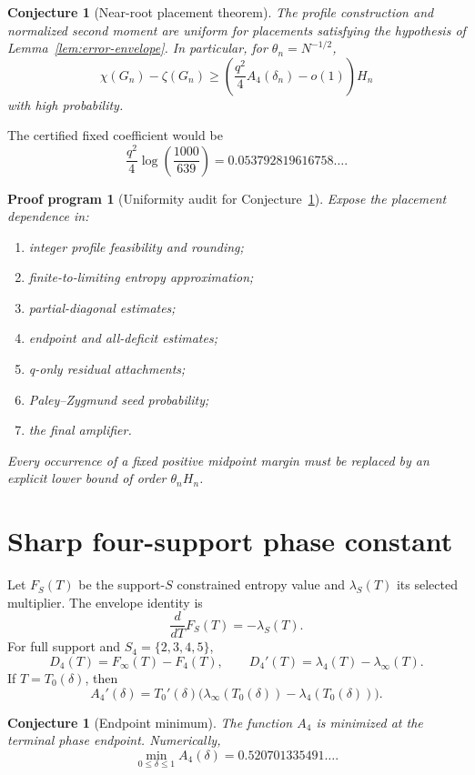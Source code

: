 \documentclass[11pt]{article}
\newtheorem{conjecture}[theorem]{Conjecture}
\newtheorem{program}[theorem]{Proof program}
\theoremstyle{definition}
\newcommand{\Afour}{A_4}
\begin{document}
\begin{conjecture}[Near-root placement theorem]
\label{conj:near-root}
The profile construction and normalized second moment are uniform for
placements satisfying the hypothesis of Lemma~\ref{lem:error-envelope}.  In
particular, for $\theta_n=N^{-1/2}$,
\[
 \chi(G_n)-\zeta(G_n)
 \ge
 \left(\frac{q^2}{4}\Afour(\delta_n)-o(1)\right)H_n
\]
with high probability.
\end{conjecture}

The certified fixed coefficient would be
\[
 \frac{q^2}{4}\log\!\left(\frac{1000}{639}\right)
 =0.053792819616758\ldots.
\]

\begin{program}[Uniformity audit for Conjecture~\ref{conj:near-root}]
Expose the placement dependence in:
\begin{enumerate}[label=(\arabic*)]
\item integer profile feasibility and rounding;
\item finite-to-limiting entropy approximation;
\item partial-diagonal estimates;
\item endpoint and all-deficit estimates;
\item q-only residual attachments;
\item Paley--Zygmund seed probability;
\item the final amplifier.
\end{enumerate}
Every occurrence of a fixed positive midpoint margin must be replaced by an
explicit lower bound of order $\theta_nH_n$.
\end{program}

\section{Sharp four-support phase constant}

Let $F_S(T)$ be the support-$S$ constrained entropy value and
$\lambda_S(T)$ its selected multiplier.  The envelope identity is
\[
 \frac{d}{dT}F_S(T)=-\lambda_S(T).
\]
For full support and $S_4=\{2,3,4,5\}$,
\[
 D_4(T)=F_\infty(T)-F_4(T),
\qquad
 D_4'(T)=\lambda_4(T)-\lambda_\infty(T).
\]
If $T=T_0(\delta)$, then
\begin{equation}
 A_4'(\delta)
 =T_0'(\delta)
 \bigl(\lambda_\infty(T_0(\delta))-\lambda_4(T_0(\delta))\bigr).
 \label{eq:phase-derivative}
\end{equation}

\begin{conjecture}[Endpoint minimum]
\label{conj:endpoint-minimum}
The function $A_4$ is minimized at the terminal phase endpoint.  Numerically,
\[
 \min_{0\le\delta\le1}A_4(\delta)
 =0.520701335491\ldots.
\]
\end{conjecture}
\end{document}

